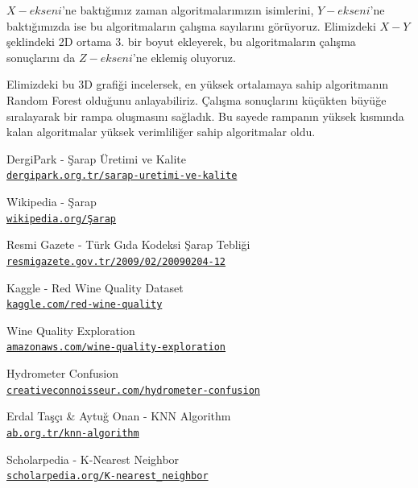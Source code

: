 \documentclass[conference]{IEEEtran}
\begin{document}
\quad $X-ekseni$'ne baktığımız zaman algoritmalarımızın isimlerini, $Y-ekseni$'ne baktığımızda ise bu algoritmaların çalışma sayılarını görüyoruz. Elimizdeki $X-Y$ şeklindeki 2D ortama 3. bir boyut ekleyerek, bu algoritmaların çalışma sonuçlarını da $Z-ekseni$'ne eklemiş oluyoruz.

\quad Elimizdeki bu 3D grafiği incelersek, en yüksek ortalamaya sahip algoritmanın Random Forest olduğunu anlayabiliriz. Çalışma sonuçlarını küçükten büyüğe sıralayarak bir rampa oluşmasını sağladık. Bu sayede rampanın yüksek kısmında kalan algoritmalar yüksek verimliliğer sahip algoritmalar oldu.

\newpage
\begin{thebibliography}{6}

DergiPark - Şarap Üretimi ve Kalite
\\\texttt{\href{https://dergipark.org.tr/tr/download/article-file/498270}{\nolinkurl{dergipark.org.tr/sarap-uretimi-ve-kalite}}}

Wikipedia - Şarap
\\\texttt{\href{https://tr.wikipedia.org/wiki/Şarap}{\nolinkurl{wikipedia.org/Şarap}}}

Resmi Gazete - Türk Gıda Kodeksi Şarap Tebliği
\\\texttt{\href{https://www.resmigazete.gov.tr/eskiler/2009/02/20090204-12.htm}{\nolinkurl{resmigazete.gov.tr/2009/02/20090204-12}}}

Kaggle - Red Wine Quality Dataset
\\\texttt{\href{https://www.kaggle.com/uciml/red-wine-quality-cortez-et-al-2009}{\nolinkurl{kaggle.com/red-wine-quality}}}

Wine Quality Exploration
\\\texttt{\href{http://rstudio-pubs-static.s3.amazonaws.com/80458_5000e31f84df449099a872ccf40747b7.html}{\nolinkurl{amazonaws.com/wine-quality-exploration}}}

Hydrometer Confusion
\\\texttt{\href{http://www.creativeconnoisseur.com/newsletter/files/497deafe6be1b2efc87df8ac6071e459-162.html}{\nolinkurl{creativeconnoisseur.com/hydrometer-confusion}}}

Erdal Taşçı \& Aytuğ Onan - KNN Algorithm
\\\texttt{\href{https://ab.org.tr/ab16/bildiri/102.pdf}{\nolinkurl{ab.org.tr/knn-algorithm}}}

Scholarpedia - K-Nearest Neighbor
\\\texttt{\href{http://scholarpedia.org/article/K-nearest_neighbor}{\nolinkurl{scholarpedia.org/K-nearest_neighbor}}}


\end{thebibliography}
\end{document}
